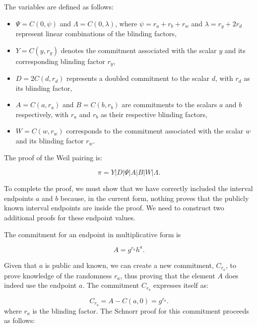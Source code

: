 \documentclass[version=preprint]{iacrcc}
\begin{document}
The variables are defined as follows:

\begin{itemize}
    \item \( \Psi = C(0, \psi) \) and \( \Lambda = C(0, \lambda) \), where \( \psi = r_{a} + r_{b} + r_{w} \) and \( \lambda = r_{y} + 2r_{d} \) represent linear combinations of the blinding factors,
    \item \( Y = C(y, r_{y}) \) denotes the commitment associated with the scalar \( y \) and its corresponding blinding factor \( r_{y} \),
    \item \( D = 2C(d, r_{d}) \) represents a doubled commitment to the scalar \( d \), with \( r_{d} \) as its blinding factor,
    \item \( A = C(a, r_{a}) \) and \( B = C(b, r_{b}) \) are commitments to the scalars \( a \) and \( b \) respectively, with \( r_{a} \) and \( r_{b} \) as their respective blinding factors,
    \item \( W = C(w, r_{w}) \) corresponds to the commitment associated with the scalar \( w \) and its blinding factor \( r_{w} \).
\end{itemize}

The proof of the Weil pairing is:

\begin{equation}
\pi = Y | D | \Psi | A | B | W | \Lambda.
\end{equation}

To complete the proof, we must show that we have correctly included the interval endpoints \( a \) and \( b \) because, in the current form, nothing proves that the publicly known interval endpoints are inside the proof. We need to construct two additional proofs for these endpoint values. 

The commitment for an endpoint in multiplicative form is

\begin{equation}
A = g^{r_{a}} h^{a}.
\end{equation}

Given that \( a \) is public and known, we can create a new commitment, \( C_{r_a} \), to prove knowledge of the randomness \( r_a \), thus proving that the element $A$ does indeed use the endpoint \(a\). The commitment \( C_{r_a} \) expresses itself as:

\begin{equation}
C_{r_a} = A - C(a, 0) = g^{r_{a}}.
\end{equation}
where \( r_{a} \) is the blinding factor. The Schnorr proof for this commitment proceeds as follows:
\end{document}
